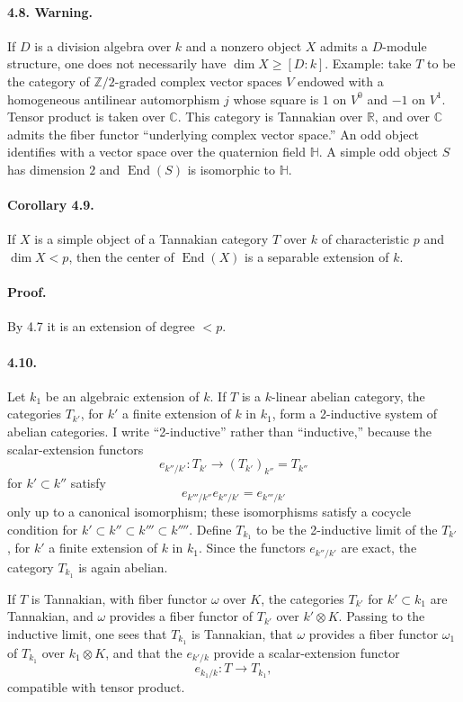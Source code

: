 \documentclass[11pt]{article}
\newcommand{\End}{\operatorname{End}}
\theoremstyle{plain}
\theoremstyle{definition}
\begin{document}
\paragraph{4.8. Warning.} If $D$ is a division algebra over $k$ and a nonzero object $X$ admits a $D$-module structure, one does not necessarily have $\dim X\ge [D:k]$. Example: take $T$ to be the category of $\mathbb Z/2$-graded complex vector spaces $V$ endowed with a homogeneous antilinear automorphism $j$ whose square is $1$ on $V^0$ and $-1$ on $V^1$. Tensor product is taken over $\mathbb C$. This category is Tannakian over $\mathbb R$, and over $\mathbb C$ admits the fiber functor ``underlying complex vector space.'' An odd object identifies with a vector space over the quaternion field $\mathbb H$. A simple odd object $S$ has dimension $2$ and $\End(S)$ is isomorphic to $\mathbb H$.

\paragraph{Corollary 4.9.} If $X$ is a simple object of a Tannakian category $T$ over $k$ of characteristic $p$ and $\dim X<p$, then the center of $\End(X)$ is a separable extension of $k$.

\paragraph{Proof.} By 4.7 it is an extension of degree $<p$.

\paragraph{4.10.} Let $k_1$ be an algebraic extension of $k$. If $T$ is a $k$-linear abelian category, the categories $T_{k'}$, for $k'$ a finite extension of $k$ in $k_1$, form a 2-inductive system of abelian categories. I write ``2-inductive'' rather than ``inductive,'' because the scalar-extension functors
\[
   e_{k''/k'}:T_{k'}\longrightarrow (T_{k'})_{k''}=T_{k''}
\]
for $k'\subset k''$ satisfy
\[
   e_{k'''/k''}e_{k''/k'}=e_{k'''/k'}
\]
only up to a canonical isomorphism; these isomorphisms satisfy a cocycle condition for $k'\subset k''\subset k'''\subset k''''$. Define $T_{k_1}$ to be the 2-inductive limit of the $T_{k'}$, for $k'$ a finite extension of $k$ in $k_1$. Since the functors $e_{k''/k'}$ are exact, the category $T_{k_1}$ is again abelian.

If $T$ is Tannakian, with fiber functor $\omega$ over $K$, the categories $T_{k'}$ for $k'\subset k_1$ are Tannakian, and $\omega$ provides a fiber functor of $T_{k'}$ over $k'\otimes K$. Passing to the inductive limit, one sees that $T_{k_1}$ is Tannakian, that $\omega$ provides a fiber functor $\omega_1$ of $T_{k_1}$ over $k_1\otimes K$, and that the $e_{k'/k}$ provide a scalar-extension functor
\[
   e_{k_1/k}:T\longrightarrow T_{k_1},
\]
compatible with tensor product.
\end{document}
